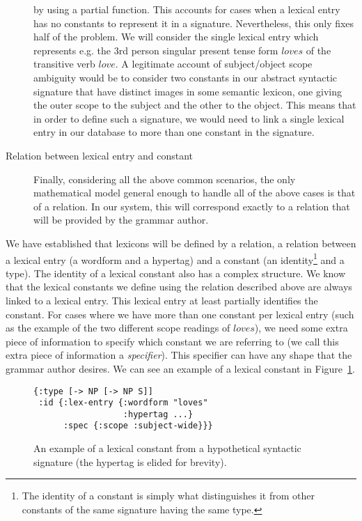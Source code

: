\begin{description}
    by using a partial function. This accounts for cases when a lexical
    entry has no constants to represent it in a signature. Nevertheless,
    this only fixes half of the problem. We will consider the single
    lexical entry which represents e.g. the 3rd person singular present
    tense form $loves$ of the transitive verb $love$. A legitimate
    account of subject/object scope ambiguity would be to consider two
    constants in our abstract syntactic signature that have distinct
    images in some semantic lexicon, one giving the outer scope to the
    subject and the other to the object. This means that in order to
    define such a signature, we would need to link a single lexical
    entry in our database to more than one constant in the signature.
  \item[Relation between lexical entry and constant] Finally,
    considering all the above common scenarios, the only mathematical
    model general enough to handle all of the above cases is that of a
    relation. In our system, this will correspond exactly to a relation
    that will be provided by the grammar author.
\end{description}

We have established that lexicons will be defined by a relation, a
relation between a lexical entry (a wordform and a hypertag) and a
constant (an identity\footnote{The identity of a constant is simply what
  distinguishes it from other constants of the same signature having the
  same type.} and a type). The identity of a lexical constant also has a
complex structure. We know that the lexical constants we define using
the relation described above are always linked to a lexical entry. This
lexical entry at least partially identifies the constant. For cases
where we have more than one constant per lexical entry (such as the
example of the two different scope readings of $loves$), we need some
extra piece of information to specify which constant we are referring to
(we call this extra piece of information a \emph{specifier}). This
specifier can have any shape that the grammar author desires. We can see
an example of a lexical constant in Figure~\ref{fig:lex-const}.

\begin{figure}
  \centering
\begin{verbatim}
{:type [-> NP [-> NP S]]
 :id {:lex-entry {:wordform "loves"
                  :hypertag ...}
      :spec {:scope :subject-wide}}}
\end{verbatim}
  \caption{\label{fig:lex-const} An example of a lexical constant from a
    hypothetical syntactic signature (the hypertag is elided for brevity).}
\end{figure}

